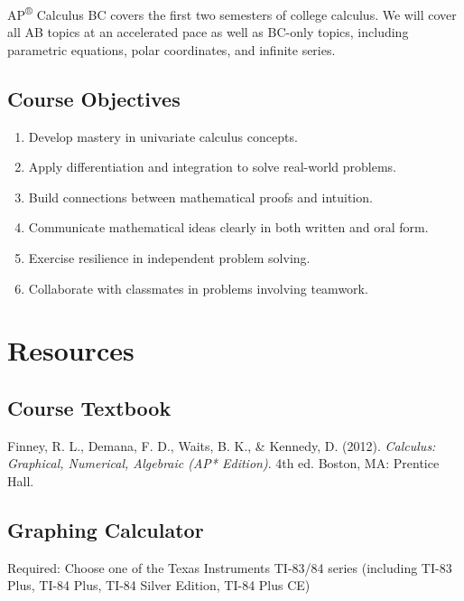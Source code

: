 \documentclass[12pt,fleqn]{article}
\providecommand{\tightlist}{%
  \setlength{\itemsep}{0pt}\setlength{\parskip}{0pt}}
\begin{document}
AP\textsuperscript{®} Calculus BC covers the first two semesters of college calculus. We will cover all AB topics at an accelerated pace as well as BC-only topics, including parametric equations, polar coordinates, and infinite series.

\hypertarget{course-objectives}{%
\subsection{Course Objectives}\label{course-objectives}}

\begin{enumerate}
\def\labelenumi{\arabic{enumi}.}
\tightlist
\item
  Develop mastery in univariate calculus concepts.
\item
  Apply differentiation and integration to solve real-world problems.
\item
  Build connections between mathematical proofs and intuition.
\item
  Communicate mathematical ideas clearly in both written and oral form.
\item
  Exercise resilience in independent problem solving.
\item
  Collaborate with classmates in problems involving teamwork.
\end{enumerate}

\hypertarget{resources}{%
\section{Resources}\label{resources}}

\hypertarget{course-textbook}{%
\subsection{Course Textbook}\label{course-textbook}}

Finney, R. L., Demana, F. D., Waits, B. K., \& Kennedy, D. (2012).
\emph{Calculus: Graphical, Numerical, Algebraic (AP* Edition)}. 4th ed.
Boston, MA: Prentice Hall.

\hypertarget{graphing-calculator}{%
\subsection{Graphing Calculator}\label{graphing-calculator}}

Required: Choose one of the Texas Instruments TI-83/84 series (including TI-83 Plus, TI-84 Plus, TI-84 Silver Edition, TI-84 Plus CE)
\end{document}
